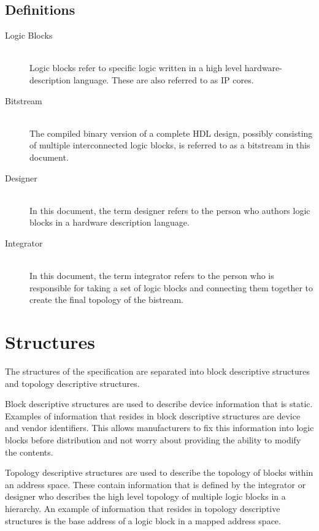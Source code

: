 \documentclass{article}
\begin{document}
\subsection{Definitions}
\begin{description}
  \item[Logic Blocks] \hfill \\
    Logic blocks refer to specific logic written in a high level hardware-description
    language. These are also referred to as IP cores.
  \item[Bitstream] \hfill \\
    The compiled binary version of a complete HDL design, possibly consisting of
    multiple interconnected logic blocks, is referred to as a bitstream in this
    document.
  \item[Designer] \hfill \\
    In this document, the term designer refers to the person who authors logic
    blocks in a hardware description language.
  \item[Integrator] \hfill \\
    In this document, the term integrator refers to the person who is responsible
    for taking a set of logic blocks and connecting them together to create the
    final topology of the bistream.
\end{description}

\pagebreak

\section{Structures}

The structures of the specification are separated into block descriptive
structures and topology descriptive structures.

Block descriptive structures are used to describe device information that
is static. Examples of information that resides in block descriptive
structures are device and vendor identifiers. This allows manufacturers to
fix this information into logic blocks before distribution and not worry
about providing the ability to modify the contents.

Topology descriptive structures are used to describe the topology of blocks
within an address space. These contain information that is defined by the
integrator or designer who describes the high level topology of multiple
logic blocks in a hierarchy. An example of information that resides in
topology descriptive structures is the base address of a logic block in a
mapped address space.
\end{document}
